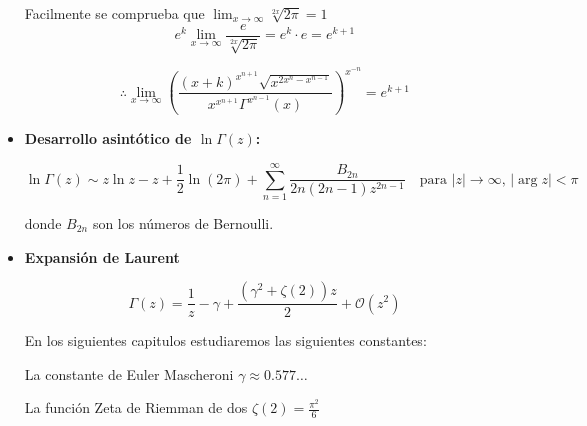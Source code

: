 \begin{itemize}
{	      Facilmente se comprueba que  $\lim_{x\to\infty} \sqrt[2x]{2\pi }=1$
	      $$
		      e^k\lim_{x \to \infty} \dfrac{e}{\sqrt[2x]{2\pi}  } =e^k\cdot e=e^{k+1}
	      $$

	      $$
		      \therefore  \lim_{x \to \infty} \left(\dfrac{(x+k)^{x^{n+1}} \sqrt{x^{2x^n-x^{n-1}} }    }{x^{x^{n+1}} \Gamma^{x^{n-1}}(x) } \right) ^{x^{-n}}=e^{k+1}
	      $$
	      }

	\item \textbf{Desarrollo asintótico de \( \ln \Gamma(z) \):}

	      \[
		      \ln \Gamma(z) \sim z \ln z - z + \frac{1}{2} \ln(2\pi) + \sum_{n=1}^\infty \frac{B_{2n}}{2n(2n-1) z^{2n-1}}
		      \quad \text{para } |z| \to \infty,\, |\arg z| < \pi
	      \]

	      donde \( B_{2n} \) son los números de Bernoulli.

	\item \textbf{Expansión de Laurent}

	      $$
		      \Gamma(z)=\frac{1}{z}-\gamma +\frac{(\gamma^2+\zeta(2))z }{2}+\mathcal{O}(z^2)
	      $$

	      En los siguientes capitulos estudiaremos las siguientes constantes:

	      La constante de Euler Mascheroni $\gamma \approx 0.577 \ldots $

	      La función Zeta de Riemman de dos $\zeta(2)=\frac{\pi^2}{6}$

\end{itemize}

